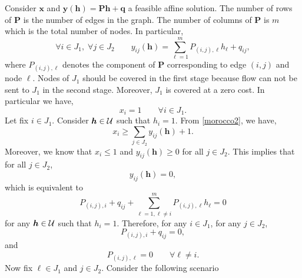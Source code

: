 \documentclass[moor]{informs1}              %
\newcommand{\mb}[1]{\ensuremath{\boldsymbol{#1}}}
\begin{document}
\begin{APPENDICES}
Consider $\mb x$ and $\mb y( \mb h ) = \mb P \mb h + \mb q$ a feasible  affine solution. The number of rows of $\mb P$ is the number of edges in the graph. The number of columns of $\mb P$ is $m$ which is the total number of nodes. In particular,
$$     \forall i \in J_1,  \;   \forall j \in J_2 \qquad      y_{ij}( \mb h ) = \sum_{\ell =1}^m P_{(i,j),\ell} h_{\ell} + q_{ij},$$
where $P_{(i,j),\ell} $ denotes the component of $\mb P$ corresponding to edge $(i,j)$ and node $\ell $. Nodes of $J_1$ should be covered in the first stage because flow can not be sent to $J_1$ in the second stage. Moreover, $J_1$ is  covered at a zero cost.  In particular we have,
$$ x_i = 1 \qquad \forall i \in J_1.$$ 
Let fix $i \in J_1$. Consider $\mb h \in {\cal U}$ such that $h_i=1$. From \eqref{morocco2}, we have, 
$$ x_i \geq \sum_{j \in J_2} y_{ij}( \mb h ) + 1.$$
Moreover, we know that $ x_i \leq 1$ and $ y_{ij}( \mb h ) \geq 0$ for all $j \in J_2$. This implies that for all $j \in J_2$,
$$ y_{ij}( \mb h ) =0,$$
which is equivalent to 
$$ P_{(i,j),i}+ q_{ij}+ \sum_{\ell =1, \ell \neq i}^m P_{(i,j),\ell} h_{\ell} =0$$
for any $\mb h \in {\cal U}$ such that $h_i=1$. Therefore, for any $i \in J_1$, for any $j \in J_2$,
$$ P_{(i,j),i}+ q_{ij} =0,$$
and 
\begin{equation} \label{eq:imo}
 P_{(i,j),\ell} =0  \qquad \forall {\ell \neq i}  .
\end{equation}
Now fix $\ell \in J_1$ and $j \in J_2$. Consider the following scenario


\end{APPENDICES}
\end{document}
